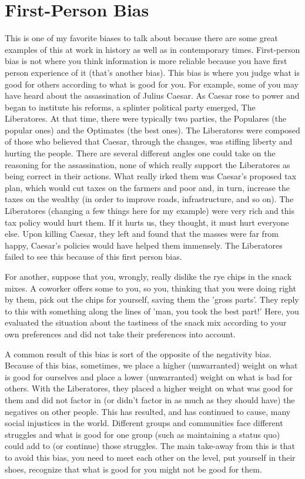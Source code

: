 \section{First-Person Bias}

This is one of my favorite biases to talk about because there are some great examples of this at work in history as well as in contemporary times. First-person bias is not where you think information is more reliable because you have first person experience of it (that's another bias). This bias is where you judge what is good for others according to what is good for you. For example, some of you may have heard about the assassination of Julius Caesar. As Caesar rose to power and began to institute his reforms, a splinter political party emerged, The Liberatores. At that time, there were typically two parties, the Populares (the popular ones) and the Optimates (the best ones). The Liberatores were composed of those who believed that Caesar, through the changes, was stifling liberty and hurting the people. There are several different angles one could take on the reasoning for the assassination, none of which really support the Liberatores as being correct in their actions. What really irked them was Caesar's proposed tax plan, which would cut taxes on the farmers and poor and, in turn, increase the taxes on the wealthy (in order to improve roads, infrastructure, and so on). The Liberatores (changing a few things here for my example) were very rich and this tax policy would hurt them. If it hurts us, they thought, it must hurt everyone else. Upon killing Caesar, they left and found that the masses were far from happy, Caesar's policies would have helped them immensely. The Liberatores failed to see this because of this first person bias. 

For another, suppose that you, wrongly, really dislike the rye chips in the snack mixes. A coworker offers some to you, so you, thinking that you were doing right by them, pick out the chips for yourself, saving them the 'gross parts'. They reply to this with something along the lines of 'man, you took the best part!' Here, you evaluated the situation about the tastiness of the snack mix according to your own preferences and did not take their preferences into account.

A common result of this bias is sort of the opposite of the negativity bias. Because of this bias, sometimes, we place a higher (unwarranted) weight on what is good for ourselves and place a lower (unwarranted) weight on what is bad for others. With the Liberatores, they placed a higher weight on what was good for them and did not factor in (or didn't factor in as much as they should have) the negatives on other people. This has resulted, and has continued to cause, many social injustices in the world. Different groups and communities face different struggles and what is good for one group (such as maintaining a status quo) could add to (or continue) those struggles. The main take-away from this is that to avoid this bias, you need to meet each other on the level, put yourself in their shoes, recognize that what is good for you might not be good for them.

